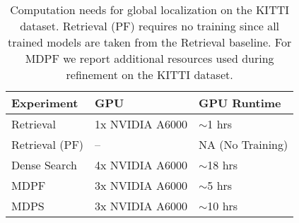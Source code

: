     
    \begin{table}[ht]
    \centering
    \caption{Computation needs for global localization on the KITTI dataset. Retrieval (PF) requires no training since all trained models are taken from the Retrieval baseline.  For MDPF we report additional resources used during refinement on the KITTI dataset.}
    \label{appx_tab:kitti_compute}
    \begin{tabular}{lll}
    \hline
    Experiment          & GPU                          & GPU Runtime  \\ \hline
    Retrieval           & 1x NVIDIA A6000              & $\sim$1 hrs \\
    Retrieval (PF)      & --                           & NA (No Training) \\
    Dense Search        & 4x NVIDIA A6000              & $\sim$18 hrs \\
    MDPF                & 3x NVIDIA A6000              & $\sim$5 hrs \\
    MDPS                & 3x NVIDIA A6000              & $\sim$10 hrs \\ \hline
    \end{tabular}
    \end{table}